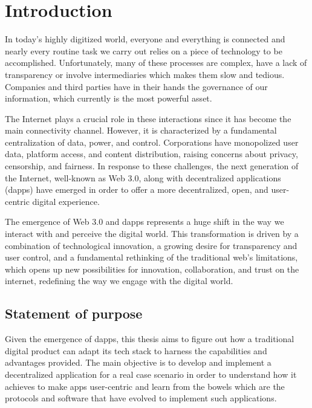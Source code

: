 \clearpage
\newpage
\section{Introduction}
{In today's highly digitized world, everyone and everything is connected and nearly every routine task we carry out relies on a piece of technology to be accomplished. Unfortunately, many of these processes are complex, have a lack of transparency or involve intermediaries which makes them slow and tedious. Companies and third parties have in their hands the governance of our information, which currently is the most powerful asset.}

{The Internet plays a crucial role in these interactions since it has become the main connectivity channel. However, it is characterized by a fundamental centralization of data, power, and control. Corporations have monopolized user data, platform access, and content distribution, raising concerns about privacy, censorship, and fairness. In response to these challenges, the next generation of the Internet, well-known as Web 3.0, along with decentralized applications (dapps) have emerged in order to offer a more decentralized, open, and user-centric digital experience.}

{The emergence of Web 3.0 and dapps represents a huge shift in the way we interact with and perceive the digital world. This transformation is driven by a combination of technological innovation, a growing desire for transparency and user control, and a fundamental rethinking of the traditional web's limitations, which opens up new possibilities for innovation, collaboration, and trust on the internet, redefining the way we engage with the digital world.}

\bigskip

\subsection{Statement of purpose}

{Given the emergence of dapps, this thesis aims to figure out how a traditional digital product can adapt its tech stack to harness the capabilities and advantages provided. The main objective is to develop and implement a decentralized application for a real case scenario in order to understand how it achieves to make apps user-centric and learn from the bowels which are the protocols and software that have evolved to implement such applications.}

